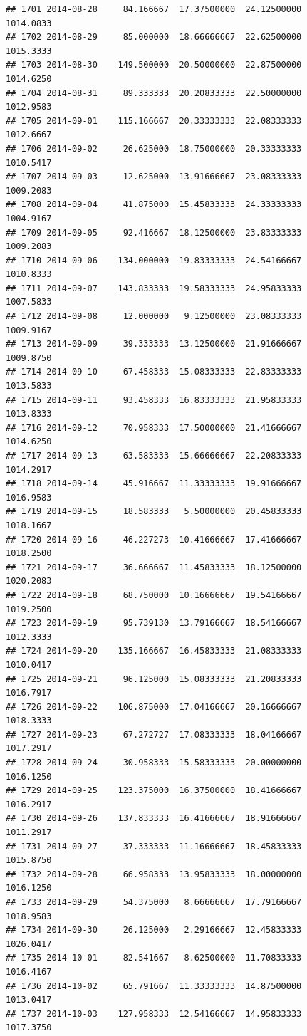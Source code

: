 \documentclass[
]{article}
\begin{document}
\begin{verbatim}
## 1701 2014-08-28     84.166667  17.37500000  24.12500000    1014.0833
## 1702 2014-08-29     85.000000  18.66666667  22.62500000    1015.3333
## 1703 2014-08-30    149.500000  20.50000000  22.87500000    1014.6250
## 1704 2014-08-31     89.333333  20.20833333  22.50000000    1012.9583
## 1705 2014-09-01    115.166667  20.33333333  22.08333333    1012.6667
## 1706 2014-09-02     26.625000  18.75000000  20.33333333    1010.5417
## 1707 2014-09-03     12.625000  13.91666667  23.08333333    1009.2083
## 1708 2014-09-04     41.875000  15.45833333  24.33333333    1004.9167
## 1709 2014-09-05     92.416667  18.12500000  23.83333333    1009.2083
## 1710 2014-09-06    134.000000  19.83333333  24.54166667    1010.8333
## 1711 2014-09-07    143.833333  19.58333333  24.95833333    1007.5833
## 1712 2014-09-08     12.000000   9.12500000  23.08333333    1009.9167
## 1713 2014-09-09     39.333333  13.12500000  21.91666667    1009.8750
## 1714 2014-09-10     67.458333  15.08333333  22.83333333    1013.5833
## 1715 2014-09-11     93.458333  16.83333333  21.95833333    1013.8333
## 1716 2014-09-12     70.958333  17.50000000  21.41666667    1014.6250
## 1717 2014-09-13     63.583333  15.66666667  22.20833333    1014.2917
## 1718 2014-09-14     45.916667  11.33333333  19.91666667    1016.9583
## 1719 2014-09-15     18.583333   5.50000000  20.45833333    1018.1667
## 1720 2014-09-16     46.227273  10.41666667  17.41666667    1018.2500
## 1721 2014-09-17     36.666667  11.45833333  18.12500000    1020.2083
## 1722 2014-09-18     68.750000  10.16666667  19.54166667    1019.2500
## 1723 2014-09-19     95.739130  13.79166667  18.54166667    1012.3333
## 1724 2014-09-20    135.166667  16.45833333  21.08333333    1010.0417
## 1725 2014-09-21     96.125000  15.08333333  21.20833333    1016.7917
## 1726 2014-09-22    106.875000  17.04166667  20.16666667    1018.3333
## 1727 2014-09-23     67.272727  17.08333333  18.04166667    1017.2917
## 1728 2014-09-24     30.958333  15.58333333  20.00000000    1016.1250
## 1729 2014-09-25    123.375000  16.37500000  18.41666667    1016.2917
## 1730 2014-09-26    137.833333  16.41666667  18.91666667    1011.2917
## 1731 2014-09-27     37.333333  11.16666667  18.45833333    1015.8750
## 1732 2014-09-28     66.958333  13.95833333  18.00000000    1016.1250
## 1733 2014-09-29     54.375000   8.66666667  17.79166667    1018.9583
## 1734 2014-09-30     26.125000   2.29166667  12.45833333    1026.0417
## 1735 2014-10-01     82.541667   8.62500000  11.70833333    1016.4167
## 1736 2014-10-02     65.791667  11.33333333  14.87500000    1013.0417
## 1737 2014-10-03    127.958333  12.54166667  14.95833333    1017.3750

\end{verbatim}
\end{document}
